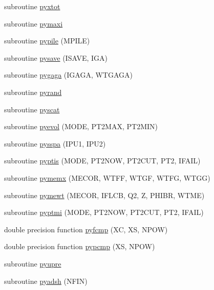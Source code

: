 \begin{DoxyCompactItemize}
subroutine \hyperlink{pythia-6_84_824_8f_aefa74679a96bc60a9275508c987b41ee}{pyxtot}
\item 
subroutine \hyperlink{pythia-6_84_824_8f_aa9cb6f1467302508501201a0e38959d1}{pymaxi}
\item 
subroutine \hyperlink{pythia-6_84_824_8f_af371bb9349e270ffd2a614762869f11c}{pypile} (M\+P\+I\+LE)
\item 
subroutine \hyperlink{pythia-6_84_824_8f_a0a7b951601d4f220cf0c8e93b43d2f79}{pysave} (I\+S\+A\+VE, I\+GA)
\item 
subroutine \hyperlink{pythia-6_84_824_8f_ae0f16bcefd12eb1fa5d163c95050c8bb}{pygaga} (I\+G\+A\+GA, W\+T\+G\+A\+GA)
\item 
subroutine \hyperlink{pythia-6_84_824_8f_a2d74d5dd64881524212b3720af2696de}{pyrand}
\item 
subroutine \hyperlink{pythia-6_84_824_8f_a421f30ce6ae114439ec80e4acd031139}{pyscat}
\item 
subroutine \hyperlink{pythia-6_84_824_8f_a15448b25c4eb515f33e35f86f376af68}{pyevol} (M\+O\+DE, P\+T2\+M\+AX, P\+T2\+M\+IN)
\item 
subroutine \hyperlink{pythia-6_84_824_8f_a9f8a08b43157ca5aa62d84247ff26109}{pysspa} (I\+P\+U1, I\+P\+U2)
\item 
subroutine \hyperlink{pythia-6_84_824_8f_ac00de061be805868aa61d626239f5fa9}{pyptis} (M\+O\+DE, P\+T2\+N\+OW, P\+T2\+C\+UT, P\+T2, I\+F\+A\+IL)
\item 
subroutine \hyperlink{pythia-6_84_824_8f_a2f7ebe82da0d6aa3faf81aba70d6f832}{pymemx} (M\+E\+C\+OR, W\+T\+FF, W\+T\+GF, W\+T\+FG, W\+T\+GG)
\item 
subroutine \hyperlink{pythia-6_84_824_8f_a15360bfe935dfa4b14c89715a3425579}{pymewt} (M\+E\+C\+OR, I\+F\+L\+CB, Q2, Z, P\+H\+I\+BR, W\+T\+ME)
\item 
subroutine \hyperlink{pythia-6_84_824_8f_af1b5061d1d80462745ef6b9ab52500f2}{pyptmi} (M\+O\+DE, P\+T2\+N\+OW, P\+T2\+C\+UT, P\+T2, I\+F\+A\+IL)
\item 
double precision function \hyperlink{pythia-6_84_824_8f_a40c4a6998ba33195decba0c36a8c74fe}{pyfcmp} (XC, XS, N\+P\+OW)
\item 
double precision function \hyperlink{pythia-6_84_824_8f_a798f90cb9dfdd7ac82ec4df67aa3c137}{pypcmp} (XS, N\+P\+OW)
\item 
subroutine \hyperlink{pythia-6_84_824_8f_aa4d454c4c02cf4ee69ed1e8031b9ad8b}{pyupre}
\item 
subroutine \hyperlink{pythia-6_84_824_8f_a3b3cb572da2912af5b37da0f6baa243b}{pyadsh} (N\+F\+IN)

\end{DoxyCompactItemize}
